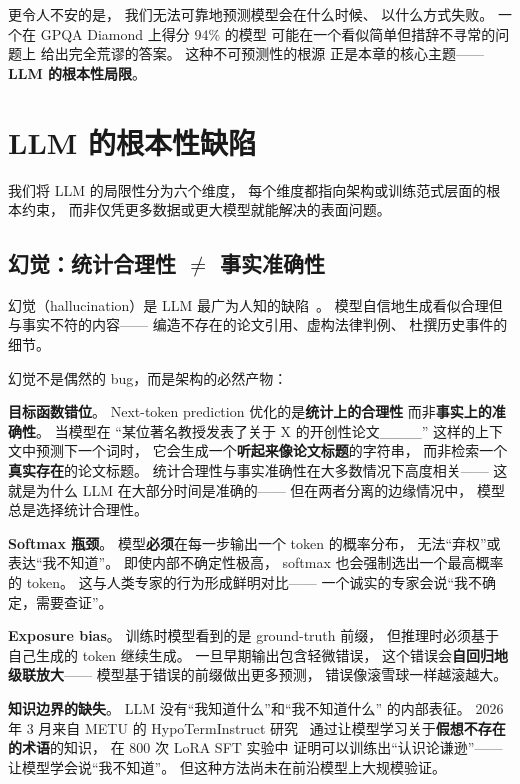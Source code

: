 更令人不安的是，
我们无法可靠地预测模型会在什么时候、
以什么方式失败。
一个在 GPQA Diamond 上得分 94\% 的模型
可能在一个看似简单但措辞不寻常的问题上
给出完全荒谬的答案。
这种不可预测性的根源
正是本章的核心主题——
\textbf{LLM 的根本性局限}。


\section{LLM 的根本性缺陷}
\label{sec:fundamental-flaws}

我们将 LLM 的局限性分为六个维度，
每个维度都指向架构或训练范式层面的根本约束，
而非仅凭更多数据或更大模型就能解决的表面问题。

\subsection{幻觉：统计合理性 $\neq$ 事实准确性}

幻觉（hallucination）是 LLM 最广为人知的缺陷~\cite{alansari2025hallucination}。
模型自信地生成看似合理但与事实不符的内容——
编造不存在的论文引用、虚构法律判例、
杜撰历史事件的细节。

幻觉不是偶然的 bug，而是架构的必然产物：

\textbf{目标函数错位}。
Next-token prediction 优化的是\textbf{统计上的合理性}
而非\textbf{事实上的准确性}。
当模型在 ``某位著名教授发表了关于 X 的开创性论文\_\_\_\_''
这样的上下文中预测下一个词时，
它会生成一个\textbf{听起来像论文标题}的字符串，
而非检索一个\textbf{真实存在}的论文标题。
统计合理性与事实准确性在大多数情况下高度相关——
这就是为什么 LLM 在大部分时间是准确的——
但在两者分离的边缘情况中，
模型总是选择统计合理性。

\textbf{Softmax 瓶颈}。
模型\textbf{必须}在每一步输出一个 token 的概率分布，
无法``弃权''或表达``我不知道''。
即使内部不确定性极高，
softmax 也会强制选出一个最高概率的 token。
这与人类专家的行为形成鲜明对比——
一个诚实的专家会说``我不确定，需要查证''。

\textbf{Exposure bias}。
训练时模型看到的是 ground-truth 前缀，
但推理时必须基于自己生成的 token 继续生成。
一旦早期输出包含轻微错误，
这个错误会\textbf{自回归地级联放大}——
模型基于错误的前缀做出更多预测，
错误像滚雪球一样越滚越大。

\textbf{知识边界的缺失}。
LLM 没有``我知道什么''和``我不知道什么''
的内部表征。
2026 年 3 月来自 METU 的 HypoTermInstruct 研究~\cite{uluoglakci2026hypoterm}
通过让模型学习关于\textbf{假想不存在的术语}的知识，
在 800 次 LoRA SFT 实验中
证明可以训练出``认识论谦逊''——
让模型学会说``我不知道''。
但这种方法尚未在前沿模型上大规模验证。

